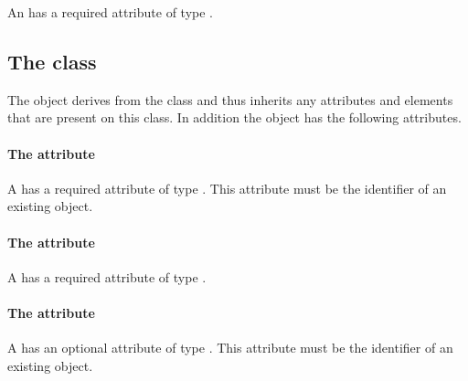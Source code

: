 An \AdvectionCoefficient has a required attribute  of
type .


\subsection{The  class}
\label{boundarycondition-class}




The \BoundaryCondition object derives from the \SBase class and thus
inherits any attributes and elements that are present on this class.
In addition the \BoundaryCondition object has the following attributes.

\paragraph{The \fixttspace{} attribute}

A \BoundaryCondition has a required attribute  of type
.
This attribute must be the identifier of an existing \Species object.


\paragraph{The \fixttspace{} attribute}

A \BoundaryCondition has a required attribute  of type
.


\paragraph{The \fixttspace{} attribute}

A \BoundaryCondition has an optional attribute
 of type .
This attribute must be the identifier of an existing \Boundary object.


